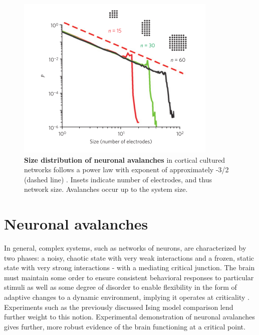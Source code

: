 \documentclass[12pt]{article}
\begin{document}
\begin{figure}      
  \begin{center}    
 \includegraphics[width=.6\textwidth]{originalavalancheplenz}    
    \caption{\textbf{Size distribution of neuronal avalanches} in cortical cultured networks follows a power law with exponent of approximately -3/2 (dashed line) \cite{Beggs2003b}. Insets indicate number of electrodes, and thus network size. Avalanches occur up to the system size.}
   \label{Figure::Neuronal Avalanches}   
  \end{center}     
   \end{figure}
   
\section*{Neuronal avalanches}

In general, complex systems, such as networks of neurons, are characterized by two phases: a noisy, chaotic state with very weak interactions and a frozen, static state with very strong interactions - with a mediating critical junction. The brain must maintain some order to ensure consistent behavioral responses to particular stimuli as well as some degree of disorder to enable flexibility in the form of adaptive changes to a dynamic environment, implying it operates at criticality \cite{Bak1987a}. Experiments such as the previously discussed Ising model comparison lend further weight to this notion. Experimental demonstration of neuronal avalanches gives further, more robust evidence of the brain functioning at a critical point.
\end{document}
